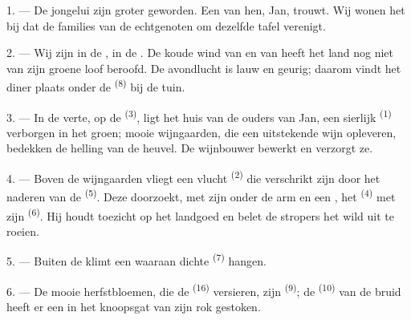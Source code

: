 
\VUsaut{4.0mm}
\VUsaut{1.6mm}
\VUsaut{3.2mm}

\VUsaut{1.6mm}
\VUsaut{2.6mm}

\VUsaut{3.0mm}

1. --- De jongelui zijn groter geworden. Een van hen, Jan, trouwt. Wij wonen het
 bij dat de families van de echtgenoten om dezelfde tafel
verenigt.

2. --- Wij zijn in de , in de . De koude wind van
 en van  heeft het land nog niet van zijn groene loof
beroofd. De avondlucht is lauw en geurig; daarom vindt het diner plaats onder de
 \textsuperscript{(8)} bij de tuin.

3. --- In de verte, op de  \textsuperscript{(3)}, ligt het huis van de ouders
van Jan, een sierlijk  \textsuperscript{(1)} verborgen in het groen; mooie
wijngaarden, die een uitstekende wijn opleveren, bedekken de helling van de heuvel. De
wijnbouwer bewerkt en verzorgt ze.

4. --- Boven de wijngaarden vliegt een vlucht  \textsuperscript{(2)} die
verschrikt zijn door het naderen van de
 \textsuperscript{(5)}. Deze doorzoekt, met zijn
 onder de arm en een , het
 \textsuperscript{(4)} met zijn 
\textsuperscript{(6)}. Hij houdt toezicht op het landgoed en belet de stropers het wild uit te
roeien.

5. --- Buiten de  klimt een  waaraan dichte
 \textsuperscript{(7)} hangen.

6. --- De mooie herfstbloemen, die de  \textsuperscript{(16)} versieren, zijn
 \textsuperscript{(9)}; de  \textsuperscript{(10)} van de
bruid heeft er een in het knoopsgat van zijn rok gestoken.


